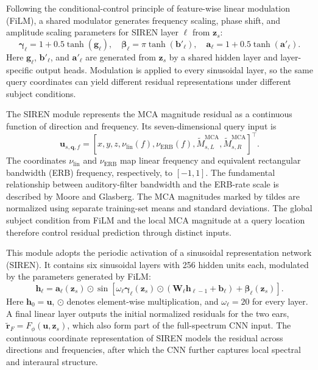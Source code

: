 \documentclass[UTF8,a4paper]{article}
\begin{document}
Following the conditional-control principle of feature-wise linear modulation (FiLM)\cite{R7}, a shared modulator generates frequency scaling, phase shift, and amplitude scaling parameters for SIREN layer $\ell$ from $\mathbf z_s$:
\begin{equation}
\boldsymbol\gamma_\ell=1+0.5\tanh(\mathbf g_\ell),\quad
\boldsymbol\beta_\ell=\pi\tanh(\mathbf b'_\ell),\quad
\mathbf a_\ell=1+0.5\tanh(\mathbf a'_\ell).
\label{eq:film-modulation}
\end{equation}
Here $\mathbf g_\ell$, $\mathbf b'_\ell$, and $\mathbf a'_\ell$ are generated from $\mathbf z_s$ by a shared hidden layer and layer-specific output heads. Modulation is applied to every sinusoidal layer, so the same query coordinates can yield different residual representations under different subject conditions.

The SIREN module represents the MCA magnitude residual as a continuous function of direction and frequency. Its seven-dimensional query input is
\begin{equation}
\mathbf u_{s,\mathbf q,f}=
[x,y,z,\nu_{\mathrm{lin}}(f),\nu_{\mathrm{ERB}}(f),
 \widetilde M^{\mathrm{MCA}}_{s,L},\widetilde M^{\mathrm{MCA}}_{s,R}]^\top .
\end{equation}
The coordinates $\nu_{\mathrm{lin}}$ and $\nu_{\mathrm{ERB}}$ map linear frequency and equivalent rectangular bandwidth (ERB) frequency, respectively, to $[-1,1]$. The fundamental relationship between auditory-filter bandwidth and the ERB-rate scale is described by Moore and Glasberg\cite{R23}. The MCA magnitudes marked by tildes are normalized using separate training-set means and standard deviations. The global subject condition from FiLM and the local MCA magnitude at a query location therefore control residual prediction through distinct inputs.

This module adopts the periodic activation of a sinusoidal representation network (SIREN)\cite{R11}. It contains six sinusoidal layers with 256 hidden units each, modulated by the parameters generated by FiLM:
\begin{equation}
\mathbf h_\ell=\mathbf a_\ell(\mathbf z_s)\odot
\sin\!\left[
\omega_\ell\boldsymbol\gamma_\ell(\mathbf z_s)\odot
(\mathbf W_\ell\mathbf h_{\ell-1}+\mathbf b_\ell)
+\boldsymbol\beta_\ell(\mathbf z_s)\right].
\label{eq:film-siren}
\end{equation}
Here $\mathbf h_0=\mathbf u$, $\odot$ denotes element-wise multiplication, and $\omega_\ell=20$ for every layer. A final linear layer outputs the initial normalized residuals for the two ears, $\widetilde{\mathbf r}_F=F_\phi(\mathbf u,\mathbf z_s)$, which also form part of the full-spectrum CNN input. The continuous coordinate representation of SIREN models the residual across directions and frequencies, after which the CNN further captures local spectral and interaural structure.
\end{document}
